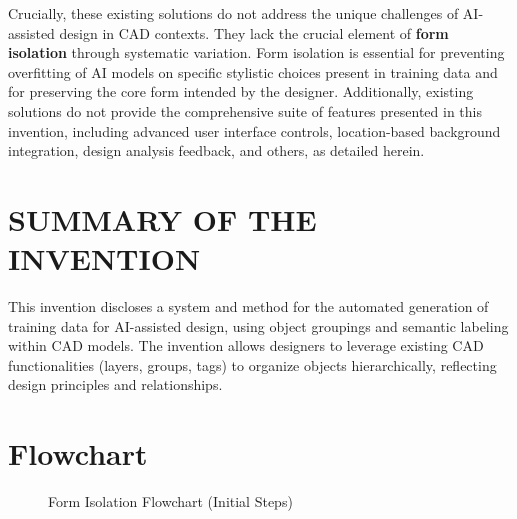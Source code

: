 \documentclass[12pt]{article}
\begin{document}
Crucially, these existing solutions do not address the unique challenges of AI-assisted design in CAD contexts. They lack the crucial element of \textbf{form isolation} through systematic variation. Form isolation is essential for preventing overfitting of AI models on specific stylistic choices present in training data and for preserving the core form intended by the designer. Additionally, existing solutions do not provide the comprehensive suite of features presented in this invention, including advanced user interface controls, location-based background integration, design analysis feedback, and others, as detailed herein.

\section{SUMMARY OF THE INVENTION}
This invention discloses a system and method for the automated generation of training data for AI-assisted design, using object groupings and semantic labeling within CAD models. The invention allows designers to leverage existing CAD functionalities (layers, groups, tags) to organize objects hierarchically, reflecting design principles and relationships. 

\section{Flowchart}

\begin{figure}[h]
  \centering
  \caption{Form Isolation Flowchart (Initial Steps)}
\end{figure}

\end{document}
